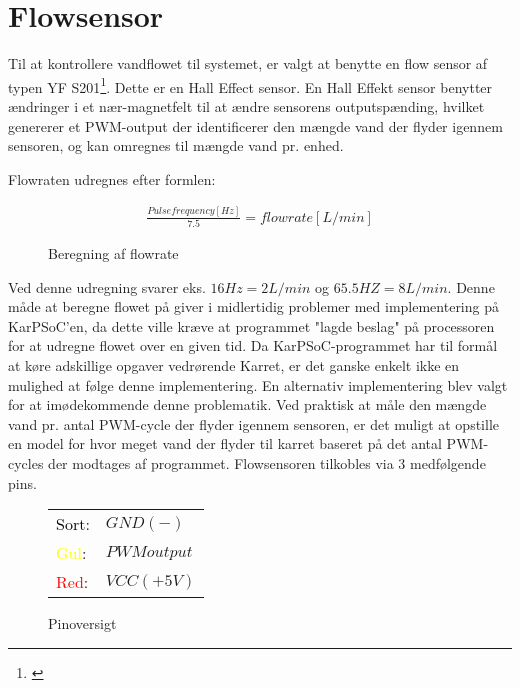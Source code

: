 
\section{Flowsensor}
Til at kontrollere vandflowet til systemet, er valgt at benytte en flow sensor af typen YF S201\footnote{\citet{nxp:YFS201}}. 
Dette er en Hall Effect sensor. En Hall Effekt sensor benytter ændringer i et nær-magnetfelt til at 
ændre sensorens outputspænding, hvilket genererer et PWM-output der identificerer den mængde vand 
der flyder igennem sensoren, og kan omregnes til mængde vand pr. enhed.

Flowraten udregnes efter formlen: 
				
\begin{figure}[H]
    \begin{align*}
       \frac{Pulse frequency [Hz]}{7.5} = flowrate[L/min]
    \end{align*}
\label{eq:PWM}
\caption{Beregning af flowrate}
\end{figure}				

Ved denne udregning svarer eks. $16Hz = 2L/min$ og $65.5HZ = 8L/min$. \newline
Denne måde at beregne flowet på giver i midlertidig problemer med implementering på KarPSoC'en, da dette ville kræve at programmet "lagde beslag" på processoren for at udregne flowet over en given tid. Da KarPSoC-programmet har til formål at køre adskillige opgaver vedrørende Karret, er det ganske enkelt ikke en mulighed at følge denne implementering.\newline
En alternativ implementering blev valgt for at imødekommende denne problematik. Ved praktisk at måle den mængde vand pr. antal PWM-cycle der flyder igennem sensoren, er det muligt at opstille en model for hvor meget vand der flyder til karret baseret på det antal PWM-cycles der modtages af programmet.\newline
Flowsensoren tilkobles via 3 medfølgende pins.

\begin{figure}[H]
	\begin{center}
		\begin{tabular}{ l l }
			 \textcolor{black}{Sort}:   & $GND(-)$ 		\\ 
			 \textcolor{yellow}{Gul}:   & $PWM output$ 	\\  
			 \textcolor{red}{Red}:    	& $VCC(+5V)$ 	\\
		\end{tabular}
	\end{center}
\caption{Pinoversigt}
\end{figure}

